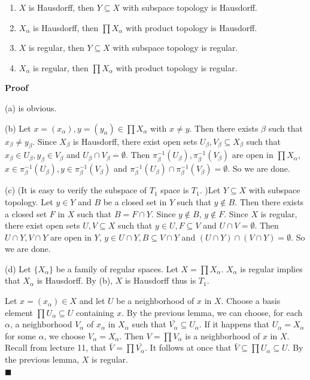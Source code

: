\documentclass[main.tex]{subfiles}
\begin{document}
\begin{theorem}
    \begin{enumerate}
        \item $X$ is Hausdorff, then $Y \subseteq X$ with subspace topology is Hausdorff.
        \item $X_{\alpha}$ is Hausdorff, then $\prod X_{\alpha}$ with product topology is Hausdorff.
        \item $X$ is regular, then $Y \subseteq X$ with subspace topology is regular. 
        \item $X_{\alpha}$ is regular, then $\prod X_{\alpha}$ with product topology is regular. 
    \end{enumerate}
\end{theorem}
\par \noindent \textbf{Proof}
\par (a) is obvious. 
\par (b) Let $x = (x_{\alpha}), y = (y_{\alpha}) \in \prod X_{\alpha}$ with $x \neq y$. Then there exists $\beta$ such that $x_{\beta} \neq y_{\beta}$. Since $X_{\beta}$ is Hausdorff, there exist open sets $U_{\beta}, V_{\beta} \subseteq X_{\beta}$ such that $x_{\beta} \in U_{\beta}, y_{\beta} \in V_{\beta}$ and $U_{\beta} \cap V_{\beta} = \emptyset$. Then $\pi_{\beta}^{-1}(U_{\beta}), \pi_{\beta}^{-1}(V_{\beta})$ are open in $\prod X_{\alpha}$, $x \in \pi_{\beta}^{-1}(U_{\beta}), y \in \pi_{\beta}^{-1}(V_{\beta})$ and $\pi_{\beta}^{-1}(U_{\beta}) \cap \pi_{\beta}^{-1}(V_{\beta}) = \emptyset$. So we are done.

\par (c) (It is easy to verify the subspace of $T_1$ space is $T_1$. )Let $Y \subseteq X$ with subspace topology. Let $y \in Y$ and $B$ be a closed set in $Y$ such that $y \notin B$. Then there exists a closed set $F$ in $X$ such that $B = F \cap Y$. Since $y \notin B$, $y \notin F$. Since $X$ is regular, there exist open sets $U, V \subseteq X$ such that $y \in U, F \subseteq V$ and $U \cap V = \emptyset$. Then $U \cap Y, V \cap Y$ are open in $Y$, $y \in U \cap Y, B \subseteq V \cap Y$ and $(U \cap Y) \cap (V \cap Y) = \emptyset$. So we are done. 

\par (d) Let $\{X_{\alpha}\}$ be a family of regular spaces. Let $X = \prod X_{\alpha}$. $X_{\alpha}$ is regular implies that $X_{\alpha}$ is Hausdorff. By (b), $X$ is Hausdorff thus is $T_1$. 
\par Let $x = (x_{\alpha}) \in X$ and let $U$ be a neighborhood of $x$ in $X$. Choose a basis element $\prod U_{\alpha} \subseteq U$ containing $x$. By the previous lemma, we can choose, for each $\alpha$, a neighborhood $V_{\alpha}$ of $x_{\alpha}$ in $X_{\alpha}$ such that $\bar{V_{\alpha}} \subseteq U_{\alpha}$. If it happens that $U_{\alpha} = X_{\alpha}$ for some $\alpha$, we choose $V_{\alpha} = X_{\alpha}$. Then $V = \prod V_{\alpha}$ is a neighborhood of $x$ in $X$. 
Recall from lecture 11, that $\bar{V} = \prod \bar{V_{\alpha}}$. It follows at once that $\bar{V} \subseteq \prod U_{\alpha} \subseteq U$. By the previous lemma, $X$ is regular. 
\mbox{} \\ \null \hfill $\blacksquare$ 
\end{document}
